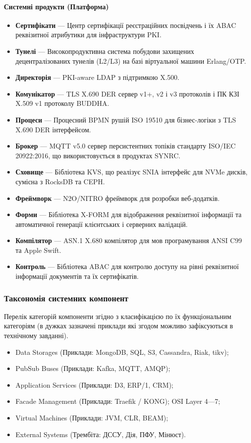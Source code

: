 \documentclass{article}
\begin{document}
\paragraph{Системні продукти (Платформа)}
\begin{itemize}
    \item \textbf{Сертифікати} --- Центр сертифікації реєстраційних посвідчень і їх ABAC реквізитної атрибутики для інфраструктури PKI.
    \item \textbf{Тунелі} --- Високопродуктивна система побудови захищених децентралізованих тунелів (L2/L3) на базі віртуальної машини Erlang/OTP.
    \item \textbf{Директорія} --- PKI-aware LDAP з підтримкою X.500.
    \item \textbf{Комунікатор} --- TLS X.690 DER сервер v1+, v2 і v3 протоколів і ПК КЗІ X.509 v1 протоколу BUDDHA.
    \item \textbf{Процеси} --- Процесний BPMN рушій ISO 19510 для бізнес-логіки з TLS X.690 DER інтерфейсом.
    \item \textbf{Брокер} --- MQTT v5.0 сервер персистентних топіків стандарту ISO/IEC 20922:2016, що використовується в продуктах SYNRC.
    \item \textbf{Сховище} --- Бібліотека KVS, що реалізує SNIA інтерфейс для NVMe дисків, сумісна з RocksDB та CEPH.
    \item \textbf{Фреймворк} --- N2O/NITRO фреймворк для розробки веб-додатків.
    \item \textbf{Форми} --- Бібліотека X-FORM для відображення реквізитної інформації та автоматичної генерації клієнтських і серверних валідацій.
    \item \textbf{Компілятор} --- ASN.1 X.680 компілятор для мов програмування ANSI C99 та Apple Swift.
    \item \textbf{Контроль} --- Бібліотека ABAC для контролю доступу на рівні реквізитної інформації документів та їх сертифікатів.
\end{itemize}

\newpage
\subsubsection{Таксономія системних компонент}

Перелік категорій компоненти згідно з класифікацією по їх функціональним категоріям (в дужках зазначені
приклади які згодом можливо зафіксуються в технічному завданні).

\begin{itemize}
  \item Data Storages (Приклади: MongoDB, SQL, S3, Cassandra, Riak, tikv);
  \item PubSub Buses (Приклади: Kafka, MQTT, AMQP);
  \item Application Services (Приклади: D3, ERP/1, CRM);
  \item Facade Management (Приклади: Traefik / KONG); OSI Layer 4—7;
  \item Virtual Machines (Приклади: JVM, CLR, BEAM);
  \item External Systems (Трембіта: ДССУ, Дія, ПФУ, Мінюст).
\end{itemize}
\end{document}
